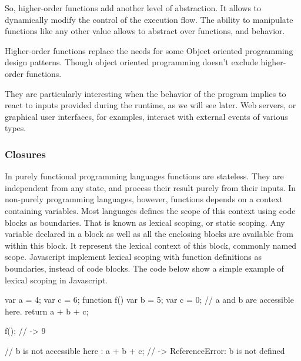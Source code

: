So, higher-order functions add another level of abstraction.
It allows to dynamically modify the control of the execution flow.
The ability to manipulate functions like any other value allows to abstract over functions, and behavior.

Higher-order functions replace the needs for some Object oriented programming design patterns. Though object oriented programming doesn't exclude higher-order functions.

They are particularly interesting when the behavior of the program implies to react to inputs provided during the runtime, as we will see later.
Web servers, or graphical user interfaces, for examples, interact with external events of various types.


\subsubsection{Closures}


In purely functional programming languages functions are stateless. They are independent from any state, and process their result purely from their inputs.
In non-purely programming languages, however, functions depends on a context containing variables.
Most languages defines the scope of this context using code blocks as boundaries.
That is known as lexical scoping, or static scoping.
Any variable declared in a block as well as all the enclosing blocks are available from within this block.
It represent the lexical context of this block, commonly named scope.
Javascript implement lexical scoping with function definitions as boundaries, instead of code blocks.
The code below show a simple example of lexical scoping in Javascript.

\begin{code}
  var a = 4;
  var c = 6;
  function f() {
    var b = 5;
    var c = 0;
    // a and b are accessible here.
    return a + b + c;
  }

  f(); // -> 9

  // b is not accessible here :
  a + b + c; // -> ReferenceError: b is not defined
\end{code}

